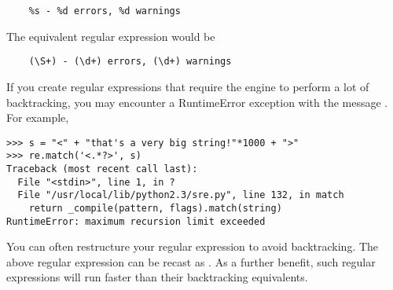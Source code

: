 \begin{verbatim}
    %s - %d errors, %d warnings
\end{verbatim}

The equivalent regular expression would be

\begin{verbatim}
    (\S+) - (\d+) errors, (\d+) warnings
\end{verbatim}


If you create regular expressions that require the engine to perform a lot
of backtracking, you may encounter a RuntimeError exception with the message
.  For example,

\begin{verbatim}
>>> s = "<" + "that's a very big string!"*1000 + ">"
>>> re.match('<.*?>', s)
Traceback (most recent call last):
  File "<stdin>", line 1, in ?
  File "/usr/local/lib/python2.3/sre.py", line 132, in match
    return _compile(pattern, flags).match(string)
RuntimeError: maximum recursion limit exceeded
\end{verbatim}

You can often restructure your regular expression to avoid backtracking.
The above regular expression can be recast as
\regexp{\textless[\textasciicircum \textgreater]*\textgreater}.  As a
further benefit, such regular expressions will run faster than their
backtracking equivalents.
